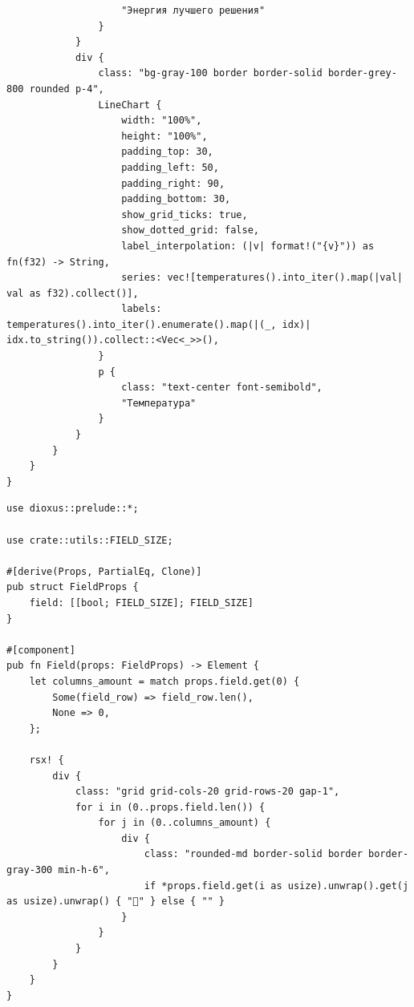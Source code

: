 \documentclass[a4paper,14pt]{extarticle}
\begin{document}
\begin{verbatim}
                    "Энергия лучшего решения"
                }
            }
            div {
                class: "bg-gray-100 border border-solid border-grey-800 rounded p-4",
                LineChart {
                    width: "100%",
                    height: "100%",
                    padding_top: 30,
                    padding_left: 50,
                    padding_right: 90,
                    padding_bottom: 30,
                    show_grid_ticks: true,
                    show_dotted_grid: false,
                    label_interpolation: (|v| format!("{v}")) as fn(f32) -> String,
                    series: vec![temperatures().into_iter().map(|val| val as f32).collect()],
                    labels: temperatures().into_iter().enumerate().map(|(_, idx)| idx.to_string()).collect::<Vec<_>>(),
                }
                p {
                    class: "text-center font-semibold",
                    "Температура"
                }
            }
        }
    }
}
\end{verbatim}

\begin{verbatim}
use dioxus::prelude::*;

use crate::utils::FIELD_SIZE;

#[derive(Props, PartialEq, Clone)]
pub struct FieldProps {
    field: [[bool; FIELD_SIZE]; FIELD_SIZE]
}

#[component]
pub fn Field(props: FieldProps) -> Element {    
    let columns_amount = match props.field.get(0) {
        Some(field_row) => field_row.len(),
        None => 0,
    };

    rsx! {
        div {
            class: "grid grid-cols-20 grid-rows-20 gap-1",
            for i in (0..props.field.len()) {
                for j in (0..columns_amount) {
                    div { 
                        class: "rounded-md border-solid border border-gray-300 min-h-6",
                        if *props.field.get(i as usize).unwrap().get(j as usize).unwrap() { "👑" } else { "" }
                    }
                }
            }
        }
    }
}
\end{verbatim}
\end{document}

